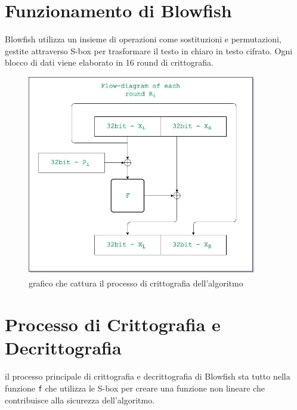 \documentclass[a4paper,12pt]{report}
\begin{document}
	\section{Funzionamento di Blowfish}

	Blowfish utilizza un insieme di operazioni come sostituzioni e permutazioni,
	gestite attraverso S-box per trasformare il testo in chiaro in
	testo cifrato. Ogni blocco di dati viene elaborato in 16 round di
	crittografia.
	\begin{figure}[H]
		\centering
		\includegraphics[width=0.9\textwidth]{encription.jpg}
		\caption{grafico che cattura il processo di crittografia dell'algoritmo \cite{blowfish-algorithm}}
		\label{fig:encription}
	\end{figure}


	\section*{Processo di Crittografia e Decrittografia}
	il processo principale di crittografia e decrittografia di Blowfish sta tutto 
	nella funzione \texttt{f} che utilizza le S-box per creare una funzione non
	lineare che contribuisce alla sicurezza dell'algoritmo.
\end{document}
